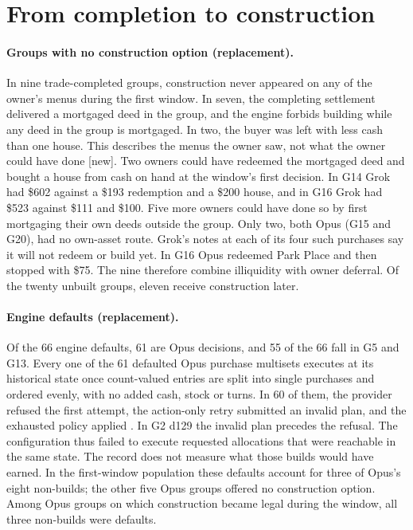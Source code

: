 
\section{From completion to construction}\label{sec:development}

\paragraph{Groups with no construction option (replacement).} In nine trade-completed groups, construction never appeared on any of the owner's menus during the first window. In seven, the completing settlement delivered a mortgaged deed in the group, and the engine forbids building while any deed in the group is mortgaged. In two, the buyer was left with less cash than one house. This describes the menus the owner saw, not what the owner could have done [new]. Two owners could have redeemed the mortgaged deed and bought a house from cash on hand at the window's first decision. In G14 Grok had \$602 against a \$193 redemption and a \$200 house, and in G16 Grok had \$523 against \$111 and \$100. Five more owners could have done so by first mortgaging their own deeds outside the group. Only two, both Opus (G15 and G20), had no own-asset route. Grok's notes at each of its four such purchases say it will not redeem or build yet. In G16 Opus redeemed Park Place and then stopped with \$75. The nine therefore combine illiquidity with owner deferral. Of the twenty unbuilt groups, eleven receive construction later.

\paragraph{Engine defaults (replacement).} Of the 66 engine defaults, 61 are Opus decisions, and 55 of the 66 fall in G5 and G13. Every one of the 61 defaulted Opus purchase multisets executes at its historical state once count-valued entries are split into single purchases and ordered evenly, with no added cash, stock or turns. In 60 of them, the provider refused the first attempt, the action-only retry submitted an invalid plan, and the exhausted policy applied \End. In G2 d129 the invalid plan precedes the refusal. The configuration thus failed to execute requested allocations that were reachable in the same state. The record does not measure what those builds would have earned. In the first-window population these defaults account for three of Opus's eight non-builds; the other five Opus groups offered no construction option. Among Opus groups on which construction became legal during the window, all three non-builds were defaults.

